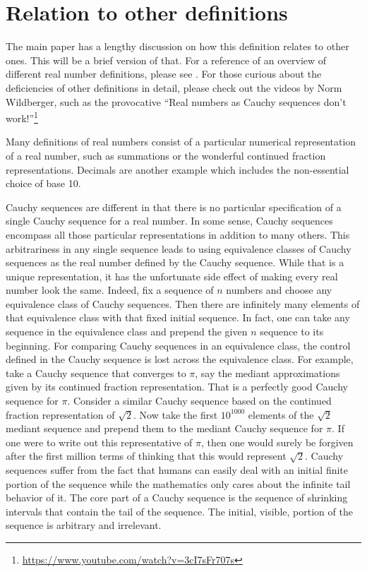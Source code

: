\documentclass[12pt]{article}
\begin{document}
\section{Relation to other definitions}

The main paper has a lengthy discussion on how this definition relates to other ones. This will be a brief version of that. For a reference of an overview of different real number definitions, please see \cite{ittay-2015}. For those curious about the deficiencies of other definitions in detail, please check out the videos by Norm Wildberger, such as the provocative ``Real numbers as Cauchy sequences don't work!''\footnote{\url{https://www.youtube.com/watch?v=3cI7sFr707s}} 

Many definitions of real numbers consist of a particular numerical representation of a real number, such as summations or the wonderful continued fraction representations. Decimals are another example which includes the non-essential choice of base 10. 

Cauchy sequences are different in that there is no particular specification of a single Cauchy sequence for a real number. In some sense, Cauchy sequences encompass all those particular representations in addition to many others. This arbitrariness in any single sequence leads to using equivalence classes of Cauchy sequences as the real number defined by the Cauchy sequence. While that is a unique representation, it has the unfortunate side effect of making every real number look the same. Indeed, fix a sequence of $n$ numbers and choose any equivalence class of Cauchy sequences. Then there are infinitely many elements of that equivalence class with that fixed initial sequence. In fact, one can take any sequence in the equivalence class and prepend the given $n$ sequence to its beginning.  For comparing Cauchy sequences in an equivalence class, the control defined in the Cauchy sequence is lost across the equivalence class. For example, take a Cauchy sequence that converges to $\pi$, say the mediant approximations given by its continued fraction representation. That is a perfectly good Cauchy sequence for $\pi$. Consider a similar Cauchy sequence based on the continued fraction representation of $\sqrt{2}$.  Now take the first $10^{1000}$ elements of the $\sqrt{2}$ mediant sequence and prepend them to  the mediant Cauchy sequence for $\pi$. If one were to write out this representative of $\pi$, then one would surely be forgiven after the first million terms of thinking that this would represent $\sqrt{2}$. Cauchy sequences suffer from the fact that humans can easily deal with an initial finite portion of the sequence while the mathematics only cares about the infinite tail behavior of it. The core part of a Cauchy sequence is the sequence of shrinking intervals that contain the tail of the sequence. The initial, visible, portion of the sequence is arbitrary and irrelevant.  
\end{document}

